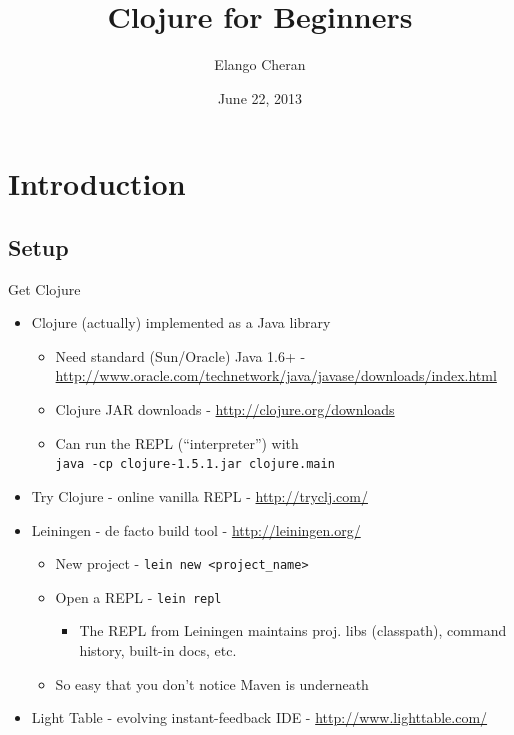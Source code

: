 \documentclass{beamer}
\author{Elango Cheran}
\title{Clojure for Beginners}
\date{June 22, 2013}
\begin{document}
\begin{frame}[plain] 
  \titlepage
\end{frame}

\section{Introduction}

\subsection{Setup}

\begin{frame}[allowframebreaks]{Get Clojure}
  \begin{itemize}
  \item Clojure (actually) implemented as a Java library
    \begin{itemize} 
    \item Need standard (Sun/Oracle) Java 1.6+ - \url{http://www.oracle.com/technetwork/java/javase/downloads/index.html}
    \item Clojure JAR downloads - \url{http://clojure.org/downloads}
    \item Can run the REPL (``interpreter'') with\\
\texttt{java -cp clojure-1.5.1.jar clojure.main}
    \end{itemize}
  \item Try Clojure - online vanilla REPL - \url{http://tryclj.com/}
    \framebreak
  \item Leiningen - de facto build tool - \url{http://leiningen.org/}
    \begin{itemize}
    \item New project - \texttt{lein new <project\_name>}
    \item Open a REPL - \texttt{lein repl}
      \begin{itemize}
      \item  The REPL from Leiningen maintains proj. libs (classpath), command
        history, built-in docs, etc.
      \end{itemize}
    \item So easy that you don't notice Maven is underneath
    \end{itemize}
  \item Light Table - evolving instant-feedback IDE - \url{http://www.lighttable.com/}
  \end{itemize}
\end{frame}
\end{document}
